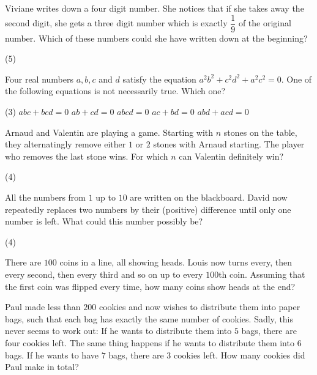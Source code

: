 \documentclass{article}
\begin{document}
\begin{problem}
Viviane writes down a four digit number. She notices that if she takes away the second digit, she gets a three digit number which is exactly $\dfrac{1}{9}$ of the original number. Which of these numbers could she have written down at the beginning?
\begin{tasks} (5)
\end{tasks}
\end{problem}

\begin{problem}
Four real numbers $a,b,c$ and $d$ satisfy the equation $a^2b^2 + c^2d^2 + a^2c^2 = 0$. One of the following equations is not necessarily true. Which one?
\begin{tasks}(3)
\task $abc + bcd = 0$
\task $ab + cd = 0$
\task $abcd = 0$
\task $ac + bd = 0$
\task $abd + acd = 0$
\end{tasks}
\end{problem}

\begin{problem}
Arnaud and Valentin are playing a game. Starting with $n$ stones on the table, they alternatingly remove either $1$ or $2$ stones with Arnaud starting. The player who removes the last stone wins. For which $n$ can Valentin definitely win?
\begin{tasks2}(4)
\end{tasks2}
\end{problem}

\begin{problem}
All the numbers from $1$ up to $10$ are written on the blackboard. David now repeatedly replaces two numbers by their (positive) difference until only one number is left. What could this number possibly be?
\begin{tasks2}(4)
\end{tasks2}
\end{problem}

\begin{problem}
There are $100$ coins in a line, all showing heads. Louis now turns every, then every second, then every third and so on up to every $100$th coin. Assuming that the first coin was flipped every time, how many coins show heads at the end?
\end{problem}

\begin{problem}
Paul made less than $200$ cookies and now wishes to distribute them into paper bags, such that each bag has exactly the same number of cookies. Sadly, this never seems to work out: If he wants to distribute them into $5$ bags, there are four cookies left. The same thing happens if he wants to distribute them into $6$ bags. If he wants to have $7$ bags, there are $3$ cookies left. How many cookies did Paul make in total?
\end{problem}
\end{document}
